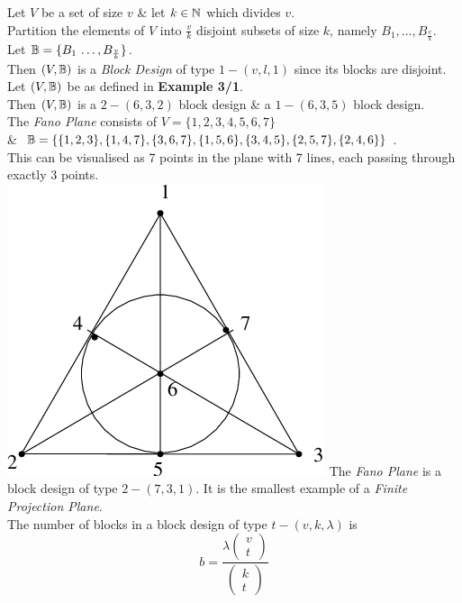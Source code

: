 \documentclass[11pt,a4paper]{article}
\begin{document}
Let $V$ be a set of size $v$ \& let $k\in\mathbb{N}$ which divides $v$.\\
Partition the elements of $V$ into $\frac{v}{k}$ disjoint subsets of size $k$, namely $B_1,\dots,B_\frac{v}{k}$.\\
Let $\mathbb{B}=\{B_1\,\dots,B_\frac{v}{k}\}$.\\
Then $(V,\mathbb{B})$ is a \textit{Block Design} of type $1-(v,l,1)$ since its blocks are disjoint.\\

Let $(V,\mathbb{B})$ be as defined in \textbf{Example 3/1}.\\
Then $(V,\mathbb{B})$ is a $2-(6,3,2)$ block design \& a $1-(6,3,5)$ block design.\\

The \textit{Fano Plane} consists of $V=\{1,2,3,4,5,6,7\}$\\
\& $\mathbb{B}=\{\{1,2,3\},\{1,4,7\},\{3,6,7\},\{1,5,6\},\{3,4,5\},\{2,5,7\},\{2,4,6\}\}$.\\
This can be visualised as 7 points in the plane with 7 lines, each passing through exactly 3 points.\\
\includegraphics[scale=0.25]{img/fanoplane.png}
\nb The \textit{Fano Plane} is a block design of type $2-(7,3,1)$. It is the smallest example of a \textit{Finite Projection Plane}.\\

The number of blocks in a block design of type $t-(v,k,\lambda)$ is
$$b=\frac{\lambda\begin{pmatrix}v\\t\end{pmatrix}}{\begin{pmatrix}k\\t\end{pmatrix}}$$
\end{document}
